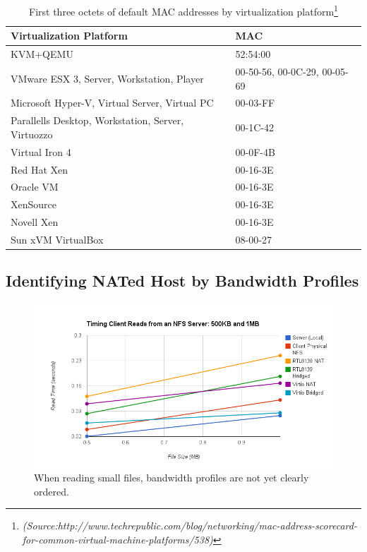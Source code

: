 \documentclass[11pt,pdftex,twocolumn]{article}
\begin{document}
\begin{center}
\begin{table}[!htb]
		\center
		\begin{tabular}{|l|l|}
		\hline
			Virtualization Platform & MAC \\
		\hline
		\hline
			KVM+QEMU & 52:54:00 \\
			VMware ESX 3, Server, Workstation, Player	& 00-50-56, 00-0C-29, 00-05-69 \\
			Microsoft Hyper-V, Virtual Server, Virtual PC	& 00-03-FF \\
			Parallells Desktop, Workstation, Server, Virtuozzo & 00-1C-42 \\
			Virtual Iron 4 & 00-0F-4B \\
			Red Hat Xen	& 00-16-3E \\
			Oracle VM	& 00-16-3E \\
			XenSource	& 00-16-3E \\
			Novell Xen & 00-16-3E \\
			Sun xVM VirtualBox & 08-00-27 \\
		\hline
		\end{tabular}
	\caption{First three octets of default MAC addresses by virtualization platform\footnote{ \emph{(Source:http://www.techrepublic.com/blog/networking/mac-address-scorecard-for-common-virtual-machine-platforms/538)}}}
	\label{tab:macaddrs}
\end{table}
\end{center}

\subsection{Identifying NATed Host by Bandwidth Profiles}
\label{subsec:BWprofiles}	

\begin{figure}[!ht]
	\center
		\includegraphics[scale=0.34]{timing_small.png}
	\caption{When reading small files, bandwidth profiles are not yet clearly ordered.}
	\label{fig:timing_small}
\end{figure}
\end{document}

